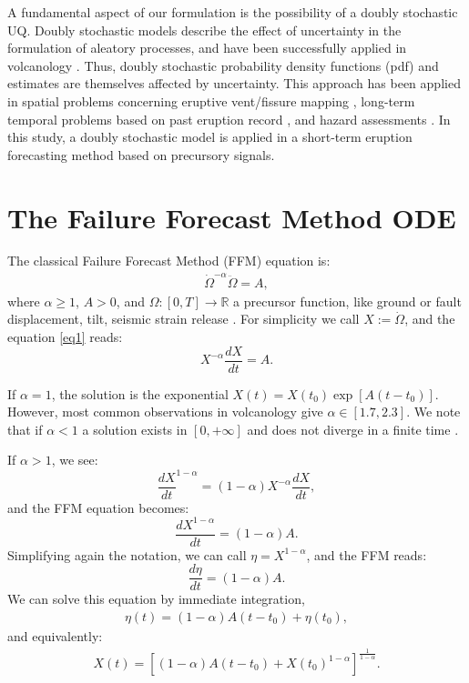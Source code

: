 \documentclass{article}
\begin{document}
A fundamental aspect of our formulation is the possibility of a doubly stochastic UQ. Doubly stochastic models describe the effect of uncertainty in the formulation of aleatory processes, and have been successfully applied in volcanology \citep{Sparks2004, Marzocchi2012, Bevilacqua2016}. Thus, doubly stochastic probability density functions (pdf) and estimates are themselves affected by uncertainty. This approach has been applied in spatial problems concerning eruptive vent/fissure mapping \citep{Selva2012, Bevilacqua2015, Tadini2017a, Tadini2017b, Bevilacqua2017a}, long-term temporal problems based on past eruption record \citep{Bebbington2013, Bevilacqua2016b, Richardson2017, Bevilacqua2018}, and hazard assessments \citep{Neri2015, Bevilacqua2017b}. In this study, a doubly stochastic model is applied in a short-term eruption forecasting method based on precursory signals.

\newpage
\section{The Failure Forecast Method ODE}
The classical Failure Forecast Method (FFM) equation is:
\begin{align}\label{eq1}
\dot\Omega^{-\alpha}\ddot{\Omega}=A,
\end{align}
where $\alpha\ge 1$, $A>0$, and $\Omega:[0,T]\rightarrow \mathbb R$ a precursor function, like ground or fault displacement, tilt, seismic strain release \citep{Voight1988}. For simplicity we call $X:=\dot\Omega$, and the equation \ref{eq1} reads:
$$X^{-\alpha}\frac{dX}{dt}=A.$$

If $\alpha=1$, the solution is the exponential $X(t)=X(t_0)\exp[A(t-t_0)]$. However, most common observations in volcanology give $\alpha\in[1.7,2.3]$. We note that if $\alpha<1$ a solution exists in $[0,+\infty]$ and does not diverge in a finite time \citep{Cornelius1995}.

If $\alpha > 1$, we see:
$$\frac{dX}{dt}^{1-\alpha}=(1-\alpha)X^{-\alpha}\frac{dX}{dt},$$
and the FFM equation becomes:
$$\frac{dX^{1-\alpha}}{dt}=(1-\alpha)A.$$
Simplifying again the notation, we can call $\eta=X^{1-\alpha}$, and the FFM reads:
$$\frac{d\eta}{dt}=(1-\alpha)A.$$
We can solve this equation by immediate integration,
\begin{align}\label{eq2a}
\eta(t)=(1-\alpha)A(t-t_0)+\eta(t_0),
\end{align}
and equivalently:
\begin{align}\label{eq2b}
X(t)=\left[(1-\alpha)A(t-t_0)+X(t_0)^{1-\alpha}\right]^{\frac{1}{1-\alpha}}.
\end{align}
\end{document}
